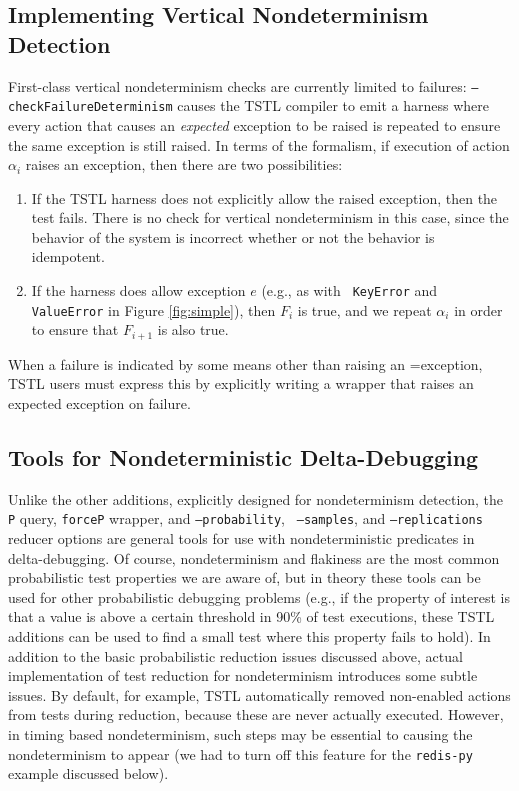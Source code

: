 \subsection{Implementing Vertical Nondeterminism Detection}
\label{sec:vertimp}

First-class vertical nondeterminism checks are currently
limited to failures:  {\tt --checkFailureDeterminism} causes the TSTL
compiler to emit a harness where every action that causes an \emph{expected}
exception to be raised is repeated to ensure the same exception is
still raised.  In terms of the formalism, if execution of action
$\alpha_i$ raises an exception, then there are two possibilities:

\begin{enumerate}
\item If the TSTL harness does not explicitly allow the raised
  exception, then the test fails.  There is no check for vertical
  nondeterminism in this case, since the behavior of the system is
  incorrect whether or not the behavior is idempotent.
  \item If the harness does allow exception $e$ (e.g., as with {\tt
      KeyError} and {\tt ValueError} in Figure \ref{fig:simple}), then
    $F_i$ is true, and we repeat $\alpha_i$ in order to ensure that
    $F_{i+1}$ is also true.
    \end{enumerate}

When a failure is indicated by some means other than raising an
=exception, TSTL users must express this by explicitly writing
a wrapper that raises an expected exception on failure.

\subsection{Tools for Nondeterministic Delta-Debugging}
\label{sec:ddimp}

Unlike the other additions, explicitly designed for nondeterminism
detection, the {\tt P} query, {\tt forceP} wrapper, and {\tt --probability}, {\tt
  --samples}, and {\tt --replications} reducer options are general
tools for use with nondeterministic predicates in delta-debugging.  Of
course, nondeterminism and flakiness are the most common probabilistic
test properties we are aware of, but in theory these tools can be used
for other probabilistic debugging problems (e.g., if the property of
interest is that a value is above a certain threshold in 90\% of test
executions, these TSTL additions can be used to find a small test where this property
fails to hold).  In addition to the basic probabilistic reduction
issues discussed above, actual implementation of test reduction for
nondeterminism introduces some subtle issues.  By default, for
example, TSTL automatically removed non-enabled actions from tests
during reduction, because these are never actually executed.  However,
in timing based nondeterminism, such steps may be essential to
causing the nondeterminism to appear (we had to turn off this feature
for the {\tt redis-py} example discussed below).



